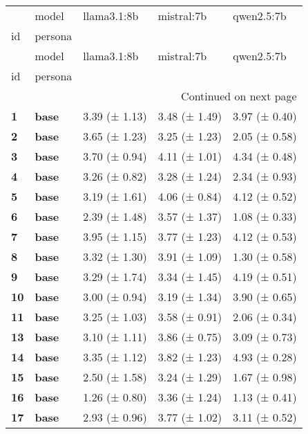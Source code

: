 \begin{longtable}{lllll}
\toprule
 & model & llama3.1:8b & mistral:7b & qwen2.5:7b \\
id & persona &  &  &  \\
\midrule
\endfirsthead
\toprule
 & model & llama3.1:8b & mistral:7b & qwen2.5:7b \\
id & persona &  &  &  \\
\midrule
\endhead
\midrule
\multicolumn{5}{r}{Continued on next page} \\
\midrule
\endfoot
\bottomrule
\endlastfoot
\textbf{1} & \textbf{base} & 3.39 (± 1.13) & 3.48 (± 1.49) & 3.97 (± 0.40) \\
\cline{1-5}
\textbf{2} & \textbf{base} & 3.65 (± 1.23) & 3.25 (± 1.23) & 2.05 (± 0.58) \\
\cline{1-5}
\textbf{3} & \textbf{base} & 3.70 (± 0.94) & 4.11 (± 1.01) & 4.34 (± 0.48) \\
\cline{1-5}
\textbf{4} & \textbf{base} & 3.26 (± 0.82) & 3.28 (± 1.24) & 2.34 (± 0.93) \\
\cline{1-5}
\textbf{5} & \textbf{base} & 3.19 (± 1.61) & 4.06 (± 0.84) & 4.12 (± 0.52) \\
\cline{1-5}
\textbf{6} & \textbf{base} & 2.39 (± 1.48) & 3.57 (± 1.37) & 1.08 (± 0.33) \\
\cline{1-5}
\textbf{7} & \textbf{base} & 3.95 (± 1.15) & 3.77 (± 1.23) & 4.12 (± 0.53) \\
\cline{1-5}
\textbf{8} & \textbf{base} & 3.32 (± 1.30) & 3.91 (± 1.09) & 1.30 (± 0.58) \\
\cline{1-5}
\textbf{9} & \textbf{base} & 3.29 (± 1.74) & 3.34 (± 1.45) & 4.19 (± 0.51) \\
\cline{1-5}
\textbf{10} & \textbf{base} & 3.00 (± 0.94) & 3.19 (± 1.34) & 3.90 (± 0.65) \\
\cline{1-5}
\textbf{11} & \textbf{base} & 3.25 (± 1.03) & 3.58 (± 0.91) & 2.06 (± 0.34) \\
\cline{1-5}
\textbf{13} & \textbf{base} & 3.10 (± 1.11) & 3.86 (± 0.75) & 3.09 (± 0.73) \\
\cline{1-5}
\textbf{14} & \textbf{base} & 3.35 (± 1.12) & 3.82 (± 1.23) & 4.93 (± 0.28) \\
\cline{1-5}
\textbf{15} & \textbf{base} & 2.50 (± 1.58) & 3.24 (± 1.29) & 1.67 (± 0.98) \\
\cline{1-5}
\textbf{16} & \textbf{base} & 1.26 (± 0.80) & 3.36 (± 1.24) & 1.13 (± 0.41) \\
\cline{1-5}
\textbf{17} & \textbf{base} & 2.93 (± 0.96) & 3.77 (± 1.02) & 3.11 (± 0.52) \\

\end{longtable}
